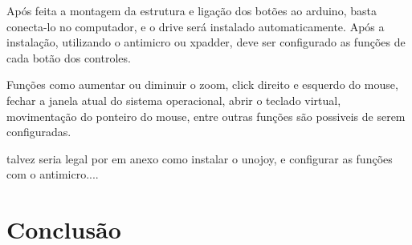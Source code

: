 \documentclass[
	12pt,			%
	openright,		%
	oneside,			%
	a4paper,			%
	chapter=TITLE,		%
	english,			%
	brazil,			%
	]{abntex2}
\begin{document}
Após feita a montagem da estrutura e ligação dos botões ao arduino, basta conecta-lo no computador, e o drive será instalado automaticamente. Após a instalação, utilizando o antimicro ou xpadder, deve ser configurado as funções de cada botão dos controles.

Funções como aumentar ou diminuir o zoom, click direito e esquerdo do mouse, fechar a janela atual do sistema operacional, abrir o teclado virtual, movimentação do ponteiro do mouse, entre outras funções são possiveis de serem configuradas.

talvez seria legal por em anexo como instalar o unojoy, e configurar as funções com o antimicro....


\chapter{Conclusão}

% 






\postextual


%





%
%

%
%
%
%
%
%
%
%
\end{document}
